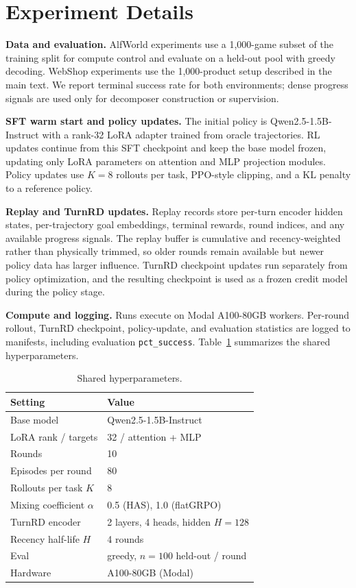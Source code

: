 \documentclass{article}
\begin{document}
\section{Experiment Details}
\label{app:expdetails}
\textbf{Data and evaluation.} AlfWorld experiments use a 1{,}000-game subset of the training
split for compute control and evaluate on a held-out pool with greedy decoding. WebShop
experiments use the 1{,}000-product setup described in the main text. We report terminal
success rate for both environments; dense progress signals are used only for decomposer
construction or supervision.

\textbf{SFT warm start and policy updates.} The initial policy is Qwen2.5-1.5B-Instruct with a
rank-32 LoRA adapter trained from oracle trajectories. RL updates continue from this SFT
checkpoint and keep the base model frozen, updating only LoRA parameters on attention and MLP
projection modules. Policy updates use $K{=}8$ rollouts per task, PPO-style clipping, and a KL
penalty to a reference policy.

\textbf{Replay and TurnRD updates.} Replay records store per-turn encoder hidden states,
per-trajectory goal embeddings, terminal rewards, round indices, and any available progress
signals. The replay buffer is cumulative and recency-weighted rather than physically trimmed,
so older rounds remain available but newer policy data has larger influence. TurnRD checkpoint
updates run separately from policy optimization, and the resulting checkpoint is used as a
frozen credit model during the policy stage.

\textbf{Compute and logging.} Runs execute on Modal A100-80GB workers. Per-round rollout,
TurnRD checkpoint, policy-update, and evaluation statistics are logged to manifests, including
evaluation \texttt{pct\_success}. Table~\ref{tab:hparams} summarizes the shared
hyperparameters.

\begin{table}[H]
  \caption{Shared hyperparameters.}
  \label{tab:hparams}
  \centering
  \begin{tabular}{ll}
    \toprule
    Setting & Value \\
    \midrule
    Base model            & Qwen2.5-1.5B-Instruct \\
    LoRA rank / targets   & 32 / attention + MLP \\
    Rounds                & 10 \\
    Episodes per round    & 80 \\
    Rollouts per task $K$ & 8 \\
    Mixing coefficient $\alpha$ & 0.5 (HAS), 1.0 (flatGRPO) \\
    TurnRD encoder        & 2 layers, 4 heads, hidden $H{=}128$ \\
    Recency half-life $H$ & 4 rounds \\
    Eval                  & greedy, $n{=}100$ held-out / round \\
    Hardware              & A100-80GB (Modal) \\
    \bottomrule
  \end{tabular}
\end{table}
\end{document}
